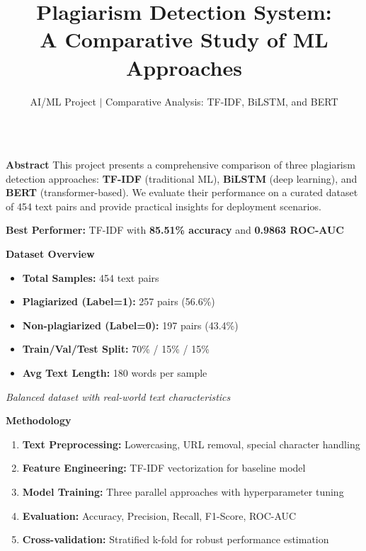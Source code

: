 \documentclass[final]{beamer}
\title{\huge \textbf{Plagiarism Detection System:\\A Comparative Study of ML Approaches}}
\author{AI/ML Project \quad $\mid$ \quad Comparative Analysis: TF-IDF, BiLSTM, and BERT}
\institute{}
\newlength{\onecolwid}
\begin{document}
\begin{frame}[fragile]
\begin{columns}[t]

\begin{column}{\onecolwid}

\begin{block}{\Large \textbf{Abstract}}
  This project presents a comprehensive comparison of three plagiarism detection approaches: \textbf{TF-IDF} (traditional ML), \textbf{BiLSTM} (deep learning), and \textbf{BERT} (transformer-based). We evaluate their performance on a curated dataset of 454 text pairs and provide practical insights for deployment scenarios.
  
  \vspace{0.3cm}
  \textbf{Best Performer:} TF-IDF with \textbf{85.51\% accuracy} and \textbf{0.9863 ROC-AUC}
\end{block}

\begin{block}{\Large \textbf{Dataset Overview}}
  \begin{itemize}
    \setlength\itemsep{0.8em}
    \item \textbf{Total Samples:} 454 text pairs
    \item \textbf{Plagiarized (Label=1):} 257 pairs (56.6\%)
    \item \textbf{Non-plagiarized (Label=0):} 197 pairs (43.4\%)
    \item \textbf{Train/Val/Test Split:} 70\% / 15\% / 15\%
    \item \textbf{Avg Text Length:} 180 words per sample
  \end{itemize}
  
  \vspace{0.3cm}
  {\small \textit{Balanced dataset with real-world text characteristics}}
\end{block}

\begin{block}{\Large \textbf{Methodology}}
  \begin{enumerate}
    \setlength\itemsep{0.6em}
    \item \textbf{Text Preprocessing:} Lowercasing, URL removal, special character handling
    \item \textbf{Feature Engineering:} TF-IDF vectorization for baseline model
    \item \textbf{Model Training:} Three parallel approaches with hyperparameter tuning
    \item \textbf{Evaluation:} Accuracy, Precision, Recall, F1-Score, ROC-AUC
    \item \textbf{Cross-validation:} Stratified k-fold for robust performance estimation
  \end{enumerate}
\end{block}


\end{column}
\end{columns}
\end{frame}
\end{document}
